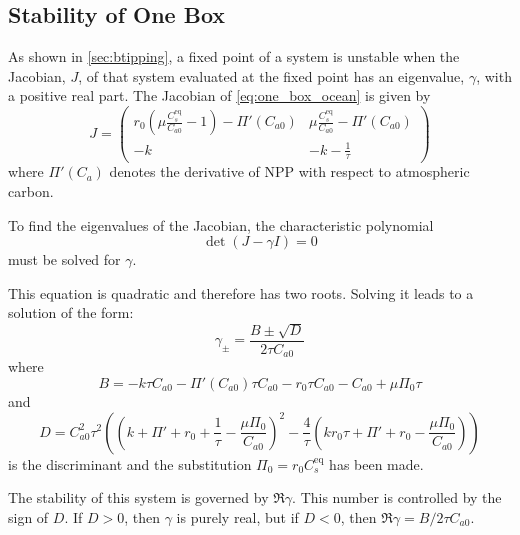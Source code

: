 \subsection{Stability of One Box}
As shown in \cref{sec:btipping}, a fixed point of a system is unstable when the Jacobian, $J$, of that system evaluated at the fixed point has an eigenvalue, $\gamma$, with a positive real part.
The Jacobian of \cref{eq:one_box_ocean} is given by
\begin{equation}
  \label{eq:jacobian_of_one_box}
    J = 
    \begin{pmatrix}
    r_0 \left( \mu \frac{C_s^{\mathrm{eq}}}{C_{a0}} - 1\right) - \Pi'(C_{a0}) & 
    \mu \frac{C_s^{\mathrm{eq}}}{C_{a0}} - \Pi'(C_{a0}) \\
    -k & -k - \frac{1}{\tau}
    \end{pmatrix}
  \end{equation}
where $\Pi'(C_a)$ denotes the derivative of NPP with respect to atmospheric carbon.
  
To find the eigenvalues of the Jacobian, the characteristic polynomial
\begin{equation}
  \label{eq:char_poly}
  \det(J - \gamma I) = 0
\end{equation}
must be solved for $\gamma$.

This equation is quadratic and therefore has two roots. Solving it leads to a solution of the form:
\begin{equation}
  \label{eq:eigenvalues_of_one_box_jac}
  \gamma_{\pm} = \frac{B \pm \sqrt{D}}{2\tau C_{a0}}
\end{equation}
where
\begin{equation}
  \label{eq:B_in_one_box}
  B = -k \tau  C_{a0}-\Pi'(C_{a0}) \tau  C_{a0}-r_0 \tau  C_{a0}-C_{a0}+\mu  \Pi_0 \tau
\end{equation}
and
\begin{equation}
  \label{eq:discriminant_from_one_box}
  D = C_{a0}^2\tau^2\left(\left(k +\Pi' +r_0  +\frac{1}{\tau}-\frac{\mu  \Pi_0}{C_{a0}} \right)^2-\frac{4}{\tau}\left(k r_0 \tau +\Pi'+r_0-\frac{\mu  \Pi_0}{C_{a0}}\right)\right)
\end{equation}
is the discriminant and the substitution $\Pi_0 = r_0 C_s^{\mathrm{eq}}$ has been made.

The stability of this system is governed by $\Re \gamma$. This number is controlled by the sign of $D$. If $D > 0$, then $\gamma$ is purely real, but if $D < 0$, then
$\Re \gamma = B / 2\tau C_{a0}$. 

